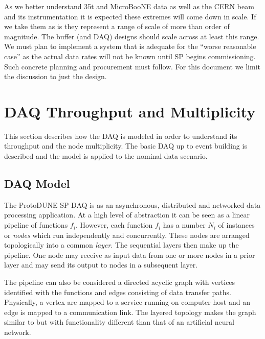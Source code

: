 \documentclass[pdftex,12pt,letter]{article}
\begin{document}
As we better understand 35t and MicroBooNE data as well as the CERN
beam and its instrumentation it is expected these extremes will come
down in scale.  If we take them as is they represent a range of scale
of more than order of magnitude.  The buffer (and DAQ) designs should
scale across at least this range.  We must plan to implement a system
that is adequate for the ``worse reasonable case'' as the actual data
rates will not be known until SP begins commissioning.  Such concrete
planning and procurement must follow.  For this document we limit the
discussion to just the design.

\section{DAQ Throughput and Multiplicity}

This section describes how the DAQ is modeled in order to understand
its throughput and the node multiplicity.  The basic DAQ up to event
building is described and the model is applied to the nominal data
scenario.

\subsection{DAQ Model}

The ProtoDUNE SP DAQ is as an asynchronous, distributed and networked
data processing application.  At a high level of abstraction it can be
seen as a linear pipeline of functions $f_i$.  However, each function
$f_i$ has a number $N_i$ of instances or \textit{nodes} which run
independently and concurrently.  These nodes are arranged
topologically into a common \textit{layer}.  The sequential layers
then make up the pipeline.  One node may receive as input data from
one or more nodes in a prior layer and may send its output to nodes in
a subsequent layer.

The pipeline can also be considered a directed acyclic graph with
vertices identified with the functions and edges consisting of data
transfer paths.  Physically, a vertex are mapped to a service running
on computer host and an edge is mapped to a communication link.  The
layered topology makes the graph similar to but with functionality
different than that of an artificial neural network.
\end{document}
